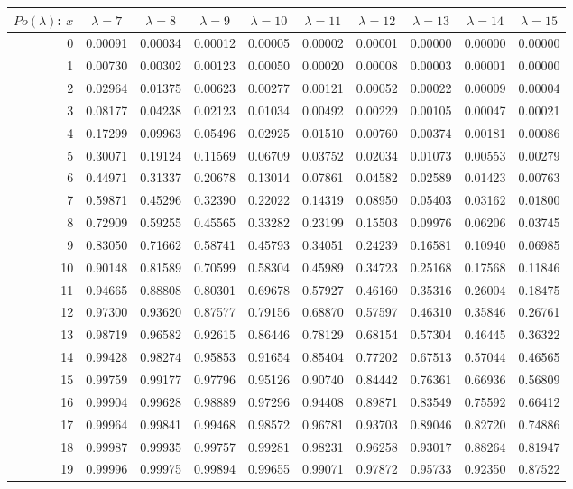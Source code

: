 \documentclass{article}
\begin{document}
{\vspace{8pt minus 6pt}
\begin{tabular}{|r|c|c|c|c|c|c|c|c|c|}
\hline
$Po(\lambda)$: $x$
   & $\lambda=7$ & $\lambda=8$ & $\lambda=9$ & $\lambda=10$ & $\lambda=11$ & $\lambda=12$ & $\lambda=13$ & $\lambda=14$ & $\lambda=15$ \\\hline
  0&0.00091&0.00034&0.00012&0.00005&0.00002&0.00001&0.00000&0.00000&0.00000\\
  1&0.00730&0.00302&0.00123&0.00050&0.00020&0.00008&0.00003&0.00001&0.00000\\
  2&0.02964&0.01375&0.00623&0.00277&0.00121&0.00052&0.00022&0.00009&0.00004\\
  3&0.08177&0.04238&0.02123&0.01034&0.00492&0.00229&0.00105&0.00047&0.00021\\
  4&0.17299&0.09963&0.05496&0.02925&0.01510&0.00760&0.00374&0.00181&0.00086\\
  5&0.30071&0.19124&0.11569&0.06709&0.03752&0.02034&0.01073&0.00553&0.00279\\
  6&0.44971&0.31337&0.20678&0.13014&0.07861&0.04582&0.02589&0.01423&0.00763\\
  7&0.59871&0.45296&0.32390&0.22022&0.14319&0.08950&0.05403&0.03162&0.01800\\
  8&0.72909&0.59255&0.45565&0.33282&0.23199&0.15503&0.09976&0.06206&0.03745\\
  9&0.83050&0.71662&0.58741&0.45793&0.34051&0.24239&0.16581&0.10940&0.06985\\
 10&0.90148&0.81589&0.70599&0.58304&0.45989&0.34723&0.25168&0.17568&0.11846\\
 11&0.94665&0.88808&0.80301&0.69678&0.57927&0.46160&0.35316&0.26004&0.18475\\
 12&0.97300&0.93620&0.87577&0.79156&0.68870&0.57597&0.46310&0.35846&0.26761\\
 13&0.98719&0.96582&0.92615&0.86446&0.78129&0.68154&0.57304&0.46445&0.36322\\
 14&0.99428&0.98274&0.95853&0.91654&0.85404&0.77202&0.67513&0.57044&0.46565\\
 15&0.99759&0.99177&0.97796&0.95126&0.90740&0.84442&0.76361&0.66936&0.56809\\
 16&0.99904&0.99628&0.98889&0.97296&0.94408&0.89871&0.83549&0.75592&0.66412\\
 17&0.99964&0.99841&0.99468&0.98572&0.96781&0.93703&0.89046&0.82720&0.74886\\
 18&0.99987&0.99935&0.99757&0.99281&0.98231&0.96258&0.93017&0.88264&0.81947\\
 19&0.99996&0.99975&0.99894&0.99655&0.99071&0.97872&0.95733&0.92350&0.87522\\

\end{tabular}}
\end{document}
